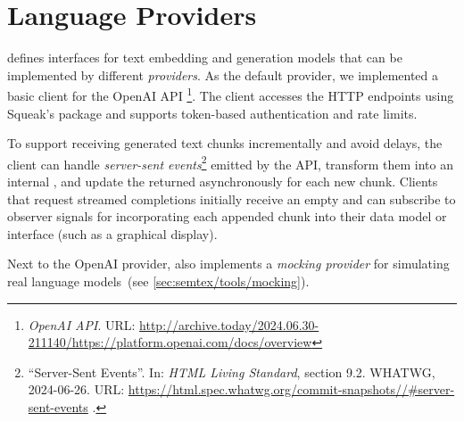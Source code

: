 
\section{Language Providers}
\label{sec:semtex/providers}

\semtex defines interfaces for text embedding and generation models that can be implemented by different \emph{providers}.
As the default provider, we implemented a basic client for the OpenAI API%
\footnote{
	\emph{OpenAI API}.
	URL:
	\url{http://archive.today/2024.06.30-211140/https://platform.openai.com/docs/overview}
}.
The client accesses the HTTP endpoints using Squeak's  package and supports token-based authentication and rate limits.

To support receiving generated text chunks incrementally and avoid delays, the client can handle \emph{server-sent events}\footnote{%
	``Server-Sent Events''.
	In: \emph{HTML Living Standard}, section 9.2.
	WHATWG, 2024-06-26.
	URL:
	\href{https://html.spec.whatwg.org/commit-snapshots/25aaad7f6a10785efe041fb05a597400e700ef10/\#server-sent-events}{https://html.spec.whatwg.org/commit-snapshots//\#server-sent-events}%
	.
} emitted by the API, transform them into an internal , and update the returned  asynchronously for each new chunk.
Clients that request streamed completions initially receive an empty  and can subscribe to observer signals for incorporating each appended chunk into their data model or interface (such as a graphical display).

Next to the OpenAI provider, \semtex also implements a \emph{mocking provider} for simulating real language models~(see \cref{sec:semtex/tools/mocking}).
